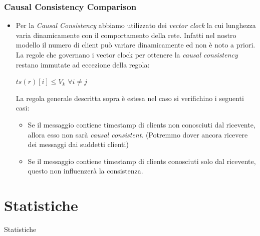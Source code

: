 \documentclass{beamer}
\begin{document}
\begin{frame}
	\frametitle{Causal Consistency Comparison}
	
	\begin{itemize}
		\item Per la \emph{Causal Consistency} abbiamo utilizzato dei \emph{vector clock} la cui lunghezza varia dinamicamente con il comportamento della rete. Infatti nel nostro modello il numero di client può variare dinamicamente ed non è noto a priori. La regole che governano i vector clock per ottenere la \emph{causal consistency} restano immutate ad eccezione della regola:\\
		
		\begin{center}
			$ts\left ( r \right )\left [ i \right ] \leq V_k$  $ \forall i \neq j$
		\end{center}
		
		
		 La regola generale descritta sopra è estesa nel caso si verifichino i seguenti casi:
		\begin{itemize}
			\item Se il messaggio contiene timestamp di clients non conosciuti dal ricevente, allora esso non sarà \emph{causal consistent}. (Potremmo dover ancora ricevere dei messaggi dai suddetti clienti)
			\item Se il messaggio contiene timestamp di clients conosciuti solo dal ricevente, questo non influenzerà la consistenza.
		\end{itemize}
	\end{itemize}
	
\end{frame}

\section{Statistiche}

\begin{frame}
	\Huge{\centerline{Statistiche}}
\end{frame}
\end{document}
